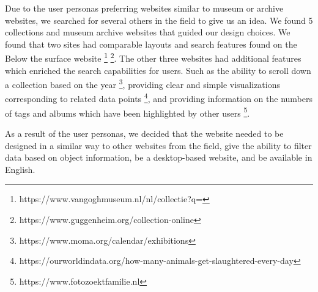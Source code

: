 Due to the user personas preferring websites similar to museum or archive websites, we searched for several others in the field to give us an idea.  We found 5 collections and museum archive websites that guided our design choices. We found that two sites had comparable layouts and search features found on the Below the surface website \footnote{https://www.vangoghmuseum.nl/nl/collectie?q=} \footnote{https://www.guggenheim.org/collection-online}.  The other three websites had additional features which enriched the search capabilities for users. Such as the ability to scroll down a collection based on the year \footnote{https://www.moma.org/calendar/exhibitions}, providing clear and simple visualizations corresponding to related data points \footnote{https://ourworldindata.org/how-many-animals-get-slaughtered-every-day}, and providing information on the numbers of tags and albums which have been highlighted by other users \footnote{https://www.fotozoektfamilie.nl}.  

As a result of the user personas, we decided that the website needed to be designed in a similar way to other websites from the field, give the ability to filter data based on object information, be a desktop-based website, and be available in English.